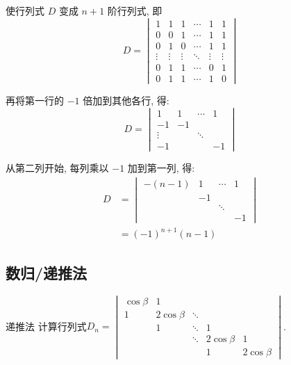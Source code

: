 \begin{solution}
    使行列式 $D$ 变成 $n+1$ 阶行列式, 即
    \[ D=\begin{vmatrix}
            1      & 1      & 1      & \cdots & 1      & 1      \\
            0      & 0      & 1      & \cdots & 1      & 1      \\
            0      & 1      & 0      & \cdots & 1      & 1      \\
            \vdots & \vdots & \vdots & \ddots & \vdots & \vdots \\
            0      & 1      & 1      & \cdots & 0      & 1      \\
            0      & 1      & 1      & \cdots & 1      & 0
        \end{vmatrix} \]

    再将第一行的 $-1$ 倍加到其他各行, 得:
    \[ D =\begin{vmatrix}
            1      & 1  & \cdots & 1  \\
            -1     & -1 &        &    \\
            \vdots &    & \ddots &    \\
            -1     &    &        & -1
        \end{vmatrix} \]

    从第二列开始, 每列乘以 $-1$ 加到第一列, 得:
    \begin{align*}
        D & =\begin{vmatrix}
                 -(n-1) & 1  & \cdots & 1  \\
                        & -1 &        &    \\
                        &    & \ddots &    \\
                        &    &        & -1
             \end{vmatrix} \\
          & =(-1)^{n+1}(n-1)
    \end{align*}
\end{solution}

\subsection{数归/递推法}

\begin{example}{}{递推法}
    计算行列式$D_n=\begin{vmatrix}
            \cos \beta & 1            &        &              &              \\
            1          & 2 \cos \beta & \ddots &              &              \\
                       & 1            & \ddots & 1            &              \\
                       &              & \ddots & 2 \cos \beta & 1            \\
                       &              &        & 1            & 2 \cos \beta
        \end{vmatrix}$.
\end{example}

